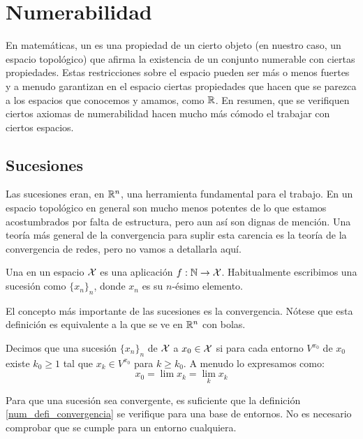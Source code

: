 \chapter{Numerabilidad}
\label{num}

En matemáticas, un  es una propiedad de un cierto objeto (en nuestro caso, un espacio topológico) que afirma la existencia de un conjunto numerable con ciertas propiedades. Estas restricciones sobre el espacio pueden ser más o menos fuertes y a menudo garantizan en el espacio ciertas propiedades que hacen que se parezca a los espacios que conocemos y amamos, como $\mathbb{R}$. En resumen, que se verifiquen ciertos axiomas de numerabilidad hacen mucho más cómodo el trabajar con ciertos espacios.

\section{Sucesiones}

Las sucesiones eran, en $\mathbb{R}^n$, una herramienta fundamental para el trabajo. En un espacio topológico en general son mucho menos potentes de lo que estamos acostumbrados por falta de estructura, pero aun así son dignas de mención. Una teoría más general de la convergencia para suplir esta carencia es la teoría de la convergencia de redes, pero no vamos a detallarla aquí. 

\begin{defi}[Sucesión]
	Una  en un espacio $\mathcal{X}$ es una aplicación $f:\mathbb{N}\to \mathcal{X}$. Habitualmente escribimos una sucesión como $\{x_n\}_n$, donde $x_n$ es su $n$-ésimo elemento. 
\end{defi}

El concepto más importante de las sucesiones es la convergencia. Nótese que esta definición es equivalente a la que se ve en $\mathbb{R}^n$ con bolas.

\begin{defi}[Convergencia]
	\label{num_defi_convergencia}
	Decimos que una sucesión $\{x_n\}_n$ de $\mathcal{X}$  a $x_0\in \mathcal{X}$ si para cada entorno $V^{x_0}$ de $x_0$ existe $k_0\geq 1$ tal que $x_k\in V^{x_0}$ para $k\geq k_0$. A menudo lo expresamos como:
	\[x_0=\lim x_k = \lim_k x_k\]
\end{defi}

\begin{obs}
	Para que una sucesión sea convergente, es suficiente que la definición \ref{num_defi_convergencia} se verifique para una base de entornos. No es necesario comprobar que se cumple para un entorno cualquiera.
\end{obs}

